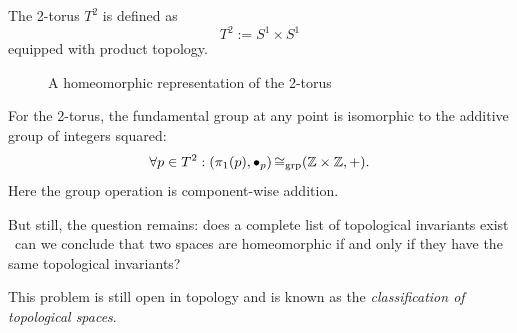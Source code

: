 \begin{example}
	The 2-torus \(T^2\) is defined as
	\begin{equation}
		T^2 := S^1 \times S^1 \label{eq:2_torus}
	\end{equation}
	equipped with product topology.
	\begin{figure}[H]
		\centering
		\caption{A homeomorphic representation of the 2-torus}
		\label{fig:2_torus}
	\end{figure} \noindent
	For the 2-torus, the fundamental group at any point is isomorphic to the additive group of integers squared:
	\begin{equation}
		\forall p \in T^2: \qty(\pi_1(p), \bullet_p) \operatorname{\mathrel{\cong_{\text{grp}}}} (\mathbb Z \times \mathbb Z, +). \label{eq:fundamental_group_torus}
	\end{equation}
	Here the group operation is component-wise addition.
\end{example}

But still, the question remains: does a complete list of topological invariants exist \ie\ can we conclude that two spaces are homeomorphic if and only if they have the same topological invariants?

This problem is still open in topology and is known as the \emph{classification of topological spaces}.
